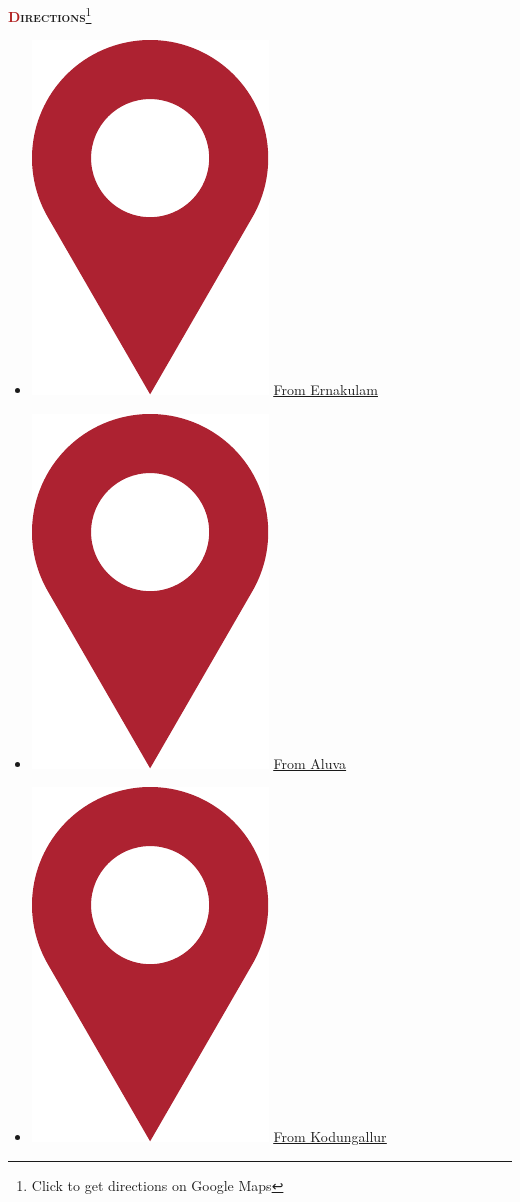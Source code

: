 \documentclass{article}
\newcommand{\h}[1]{\textcolor{FireBrick}{#1}}
\newcommand*{\pin}{%
  \includegraphics[height=\heightof{M}]{pin}%
}
\begin{document}
\medbreak
{\scshape \textbf{\h{D}irections}}\footnote{Click to get directions on Google Maps}
\begin{itemize}
	\item[] {\normalsize \pin} \underline{\href{https://www.google.co.in/maps/dir/Mount+Carmel+Church,+Pottakuzhi+-+Mamangalam+Rd,+Mamangalam,+Elamakkara,+Ernakulam,+Kerala+682025/Cherai+Beach+Resorts,+Cherai,+Vypin,+Kerala/@10.0633394,76.1809834,12z/data=!3m1!4b1!4m13!4m12!1m5!1m1!1s0x3b080d0fa96af125:0x696a9989e82b6c02!2m2!1d76.3032795!2d10.0093666!1m5!1m1!1s0x3b0810a300000001:0xebdd3e12cda825ee!2m2!1d76.1986595!2d10.1363985}{From Ernakulam}}

	\item[] {\normalsize \pin} \underline{\href{https://www.google.co.in/maps/dir/Aluva+Railway+Station,+Periyar+Nagar,+Aluva,+Kerala/Cherai+Beach+Resorts,+Cherai,+Vypin,+Kerala/@10.126786,76.2902413,13.25z/data=!4m13!4m12!1m5!1m1!1s0x3b080f29eb7eb615:0xb454e4d93b04846c!2m2!1d76.3567139!2d10.1086654!1m5!1m1!1s0x3b086d34d768e025:0x4fa5702ae301f77f!2m2!1d76.1805941!2d10.1363345}{From Aluva}}
	\item[] {\normalsize \pin} \underline{\href{https://www.google.co.in/maps/dir/Kodungallur+Bhagavathy+Temple,+Kodungallur,+Kerala/Cherai+Beach+Resorts,+Cherai,+Vypin,+Kerala/@10.1821016,76.1630008,13z/data=!3m1!4b1!4m13!4m12!1m5!1m1!1s0x3b081bf47f4c042f:0x7e6f994f0db02349!2m2!1d76.1984602!2d10.2268941!1m5!1m1!1s0x3b086d34d768e025:0x4fa5702ae301f77f!2m2!1d76.1805941!2d10.1363345}{From Kodungallur}}
\end{itemize}
\end{document}
